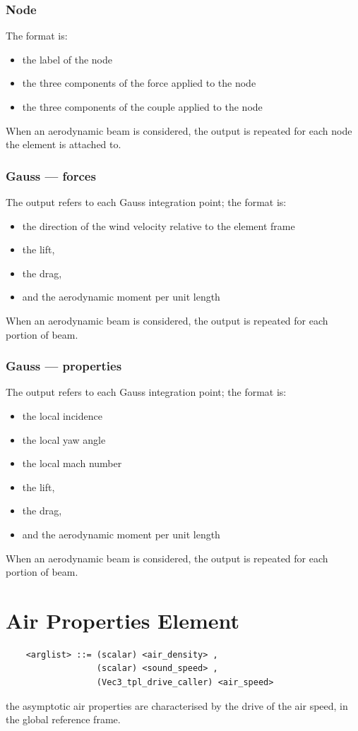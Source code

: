 \documentclass[10pt,dvips]{report}
\begin{document}
\subsubsection{Node}
The format is:
\begin{itemize}
    \item the label of the node
    \item the three components of the force applied to the node
    \item the three components of the couple applied to the node
\end{itemize}
When an aerodynamic beam is considered, the output is repeated for each node
the element is attached to.

\subsubsection{Gauss --- forces}
The output refers to each Gauss integration point; the format is:
\begin{itemize}
    \item the direction of the wind velocity relative to the element frame
    \item the lift,
    \item the drag,
    \item and the aerodynamic moment per unit length
\end{itemize}
When an aerodynamic beam is considered, the output is repeated for each
portion of beam.

\subsubsection{Gauss --- properties}
The output refers to each Gauss integration point; the format is:
\begin{itemize}
    \item the local incidence
    \item the local yaw angle
    \item the local mach number
    \item the lift,
    \item the drag,
    \item and the aerodynamic moment per unit length
\end{itemize}
When an aerodynamic beam is considered, the output is repeated for each
portion of beam.






\section{Air Properties Element}
\begin{verbatim}
    <arglist> ::= (scalar) <air_density> , 
                  (scalar) <sound_speed> ,
                  (Vec3_tpl_drive_caller) <air_speed>
\end{verbatim}
the asymptotic air properties are characterised by the drive of the 
air speed, in the global reference frame.
\end{document}
